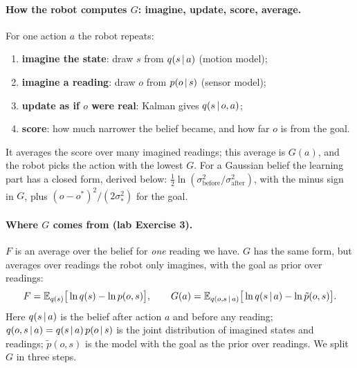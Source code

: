 \documentclass[11pt]{article}
\begin{document}
\paragraph{How the robot computes $G$: imagine, update, score, average.} For one action $a$ the robot repeats:
\begin{enumerate}[nosep, label=\textbf{\arabic*.}]
\item \textbf{imagine the state}: draw $s$ from $q(s\,|\, a)$ (motion model);
\item \textbf{imagine a reading}: draw $o$ from $p(o\,|\, s)$ (sensor model);
\item \textbf{update as if $o$ were real}: Kalman gives $q(s\,|\, o,a)$;
\item \textbf{score}: how much narrower the belief became, and how far $o$ is from the goal.
\end{enumerate}
It averages the score over many imagined readings; this average is $G(a)$, and the robot picks the action with the lowest $G$. For a Gaussian belief the learning part has a closed form, derived below: $\tfrac12\ln(\sigma^2_{\text{before}}/\sigma^2_{\text{after}})$, with the minus sign in $G$, plus $(o - o^*)^2/(2\sigma_*^2)$ for the goal.

\paragraph{Where $G$ comes from (lab Exercise 3).} $F$ is an average over the belief for \emph{one} reading we have. $G$ has the same form, but averages over readings the robot only imagines, with the goal as prior over readings:
\[
F = \mathbb{E}_{q(s)}\big[\ln q(s) - \ln p(o,s)\big],\qquad
G(a) = \mathbb{E}_{q(o,s\,|\, a)}\big[\ln q(s\,|\, a) - \ln\tilde p(o,s)\big] .
\]
Here $q(s\,|\, a)$ is the belief after action $a$ and before any reading; $q(o,s\,|\, a) = q(s\,|\, a)\,p(o\,|\, s)$ is the joint distribution of imagined states and readings; $\tilde p(o,s)$ is the model with the goal as the prior over readings. We split $G$ in three steps.
\end{document}

